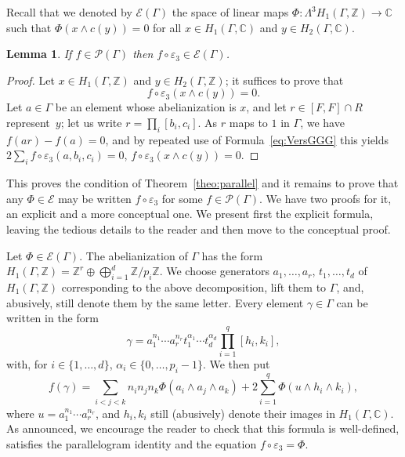 \documentclass[JEP,XML,SOM,Unicode,NoEqCountersInSection]{cedram}
\let\mathcal\mathscr
\newtheorem{lemma}[theorem]{Lemma}
\theoremstyle{definition}
\newcommand{\ZZ}{\mathbb{Z}}
\newcommand{\CC}{\mathbb{C}}
\begin{document}
Recall that we denoted by $\mathcal{E}(\Gamma)$ the space of linear maps
$\Phi:\Lambda^3 H_1(\Gamma,\ZZ)\to \CC$ such that $\Phi(x\wedge c(y))=0$
for all $x\in H_1(\Gamma,\CC)$ and $y\in H_2(\Gamma,\CC)$.

\begin{lemma}\label{H2necessaire}
If $f\in \mathcal{P}(\Gamma)$ then
$f\circ\varepsilon_3\in \mathcal{E}(\Gamma)$.
\end{lemma}
\begin{proof}
Let $x\!\in\!H_1(\Gamma,\ZZ)$ and $y\!\in\!H_2(\Gamma,\ZZ)$; it suffices to prove
that
\[
f\circ\varepsilon_3(x\wedge c(y))=0.
\]
Let $a\in\Gamma$ be an element
whose abelianization is $x$, and let $r\in[F,F]\cap R$ represent~$y$; let us write $r=\prod_i[b_i,c_i]$. As $r$ maps to $1$ in $\Gamma$,
we have $f(ar)-f(a)=0$, and by repeated use of Formula~\eqref{eq:VersGGG}
this yields $2\sum_i f\circ\varepsilon_3(a,b_i,c_i)=0$, \ie 
\hbox{$f\circ\varepsilon_3(x\wedge c(y))=0$}.
\end{proof}

This proves the condition of Theorem~\ref{theo:parallel} and it remains to
prove that any $\Phi\in \mathcal{E}$ may be written $f\circ\varepsilon_3$
for some $f\in\mathcal{P}(\Gamma)$. We have two proofs for it, an explicit
and a more conceptual one. We present first the explicit formula, leaving
the tedious details to the reader and then move to the conceptual proof.

Let $\Phi\in\mathcal{E}(\Gamma)$. The abelianization of $\Gamma$ has the form
$H_1(\Gamma,\ZZ)=\ZZ^r\oplus \bigoplus_{i=1}^d \ZZ/p_i\ZZ.$ We choose generators
$a_1,\ldots,a_r$, $t_1,\ldots,t_d$ of $H_1(\Gamma,\ZZ)$ corresponding to the
above decomposition, lift them to $\Gamma$, and, abusively, still denote them
by the same letter. Every element $\gamma\in\Gamma$ can be written in the form
\begin{equation}\label{ecrireg}
\gamma=a_1^{n_1}\cdots a_r^{n_r}t_1^{\alpha_1}\cdots
t_d^{\alpha_d}\prod_{i=1}^q[h_i,k_i],
\end{equation}
with, for $i\in\{1,\ldots,d\}$, $\alpha_i\in\{0,\ldots,p_i-1\}$. We then put
\begin{equation}
f(\gamma)= \sum_{i<j<k} n_in_jn_k\Phi(a_i\wedge a_j\wedge a_k)
+2\sum_{i=1}^q\Phi(u\wedge h_i\wedge k_i),
\end{equation}
where $u=a_1^{n_1}\cdots a_r^{n_r}$, and $h_i,k_i$ still (abusively) denote
their images in $H_1(\Gamma,\CC)$. As announced, we encourage the reader to
check that this formula is well-defined, satisfies the parallelogram
identity and the equation $f\circ\varepsilon_3=\Phi$.
\end{document}
